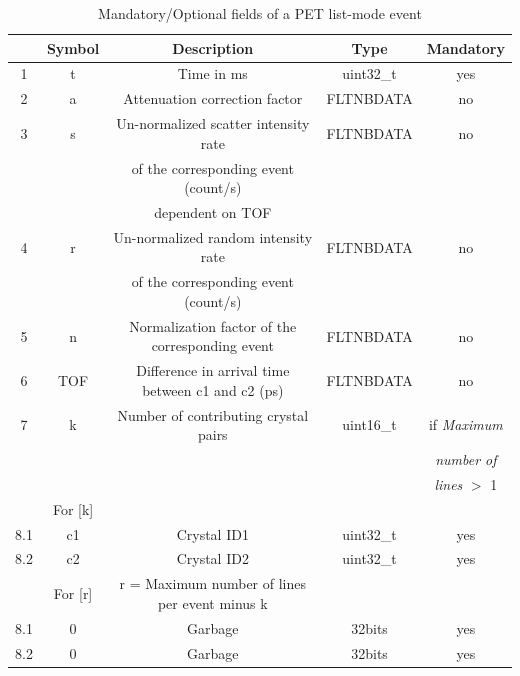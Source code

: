 \documentclass[a4paper, 11pt]{article}
\begin{document}
\begin{table} [h!]
  \small
  \caption{Mandatory/Optional fields of a PET list-mode event}
  \label{table_PET_data_bin_list-mode}
  \begin{center}
  \begin{tabular}{|c|c|c|c|c|}
  \hline
   & \textbf{Symbol} & \textbf{Description} & \textbf{Type} & \textbf{Mandatory}\\
  \hline
  \hline
  1 & t & Time in ms & uint32\_t & yes \\ \hline
  2 & a & Attenuation correction factor & FLTNBDATA & no \\ \hline
  3 & s & Un-normalized scatter intensity rate & FLTNBDATA & no \\
    & &  of the corresponding event (count/s) &  & \\
    & &  dependent on TOF &  & \\ \hline
  4 & r & Un-normalized random intensity rate & FLTNBDATA & no \\
    & & of the corresponding event (count/s) & & \\ \hline
  5 & n & Normalization factor of the corresponding event & FLTNBDATA & no \\ \hline
  6 & TOF & Difference in arrival time between c1 and c2 (ps) & FLTNBDATA & no \\ \hline
  7 & k & Number of contributing crystal pairs & uint16\_t & if \textit{Maximum} \\
    & & & &                                                     \textit{number of} \\
    & & & &                                                     \textit{lines} $>$ 1 \\ \hline
  \cellcolor{blue!25}& \cellcolor{blue!25}For [k]&\cellcolor{blue!25}&\cellcolor{blue!25}&\cellcolor{blue!25} \\ \hline
  8.1 & c1 & Crystal ID1 & uint32\_t & yes \\ \hline
  8.2 & c2 & Crystal ID2 & uint32\_t & yes \\ \hline
  \cellcolor{blue!25}& \cellcolor{blue!25}For [r]&\cellcolor{blue!25}r = Maximum number of lines per event minus k & \cellcolor{blue!25}&\cellcolor{blue!25}  \\ \hline
  8.1 & 0 & Garbage & 32bits & yes \\ \hline
  8.2 & 0 & Garbage & 32bits & yes \\ \hline
  \end{tabular}
  \end{center}
\end{table}
\end{document}
